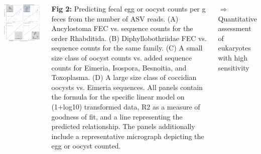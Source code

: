 \documentclass[30pt, a0paper, portrait, margin=0mm, innermargin=15mm,
               blockverticalspace=15mm, colspace=15mm, subcolspace=8mm]{tikzposter}
\begin{document}
\begin{columns}
      {
        \begin{minipage}{0.5\linewidth}                  
          \begin{left}
            \includegraphics[scale=0.5]{Figure2_man.png}
          \end{left}
        \end{minipage}
        \hfill
        \begin{minipage}{0.5\linewidth}
          \textbf{Fig 2:} Predicting fecal egg or oocyst counts per g
          feces from the number of ASV reads. (A) Ancylostoma FEC
          vs. sequence counts for the order Rhabditida. (B)
          Diphyllobothriidae FEC vs. sequence counts for the same
          family. (C) A small size class of oocyst counts vs. added
          sequence counts for Eimeria, Isospora, Besnoitia, and
          Toxoplasma. (D) A large size class of coccidian oocysts
          vs. Eimeria sequences. All panels contain the formula for
          the specific linear model on (1+log10) transformed data, R2
          as a measure of goodness of fit, and a line representing the
          predicted relationship. The panels additionally include a
          representative micrograph depicting the egg or oocyst
          counted.\\
        \end{minipage}
        $\Rightarrow$ Quantitative assessment of eukaryotes with high
        sensitivity }


\end{columns}
\end{document}
